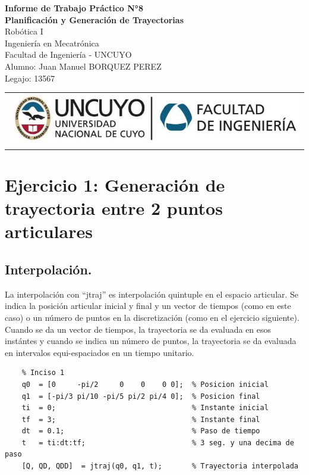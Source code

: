 \documentclass[a4paper,12pt]{article}
\begin{document}
\begin{titlepage}
    \centering
    \vspace*{5cm}
    {\Huge\bfseries Informe de Trabajo Práctico N°8}\\
    \vspace{0.2cm}
    {\Large \textbf{Planificación y Generación de Trayectorias}}\\
    \vspace{0.5cm}
    {\Large Robótica I}\\
    \vspace{0.5 cm}
    {\Large Ingeniería en Mecatrónica}\\
    \vspace{0.2 cm}
    {\Large Facultad de Ingeniería - UNCUYO}\\
    \vspace{1.5cm}
    Alumno: Juan Manuel BORQUEZ PEREZ\\
    Legajo: 13567\\
    \vfill
    {\begin{tabular}{@{}c@{}}\includegraphics[scale=0.4]{escudo.PNG}\end{tabular}}\hspace{10pt}
\end{titlepage}

\section{Ejercicio 1:  Generación de trayectoria entre 2 puntos articulares}
\subsection{Interpolación.}
La interpolación con ``jtraj'' es interpolación quintuple en el espacio articular.
Se indica la posición articular inicial y final y un vector de tiempos (como en este caso) o 
un número de puntos en la discretización (como en el ejercicio siguiente). Cuando se da un vector de tiempos,
la trayectoria se da evaluada en esos instántes y cuando 
se indica un número de puntos, la trayectoria se da evaluada en intervalos equi-espaciados en un tiempo unitario.

\begin{lstlisting}
    % Inciso 1
    q0  = [0     -pi/2     0    0    0 0];  % Posicion inicial
    q1  = [-pi/3 pi/10 -pi/5 pi/2 pi/4 0];  % Posicion final
    ti  = 0;                                % Instante inicial
    tf  = 3;                                % Instante final
    dt  = 0.1;                              % Paso de tiempo
    t   = ti:dt:tf;                         % 3 seg. y una decima de paso
    [Q, QD, QDD]  = jtraj(q0, q1, t);       % Trayectoria interpolada
\end{lstlisting}
\end{document}
